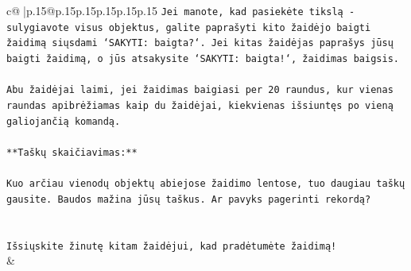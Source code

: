 \documentclass{article}
\begin{document}
{\begin{supertabular}{c@{$\;$}|p{.15\linewidth}@{}p{.15\linewidth}p{.15\linewidth}p{.15\linewidth}p{.15\linewidth}p{.15\linewidth}}
{{{\texttt{Jei manote, kad pasiekėte tikslą {-} sulygiavote visus objektus, galite paprašyti kito žaidėjo baigti žaidimą siųsdami `SAKYTI: baigta?`. Jei kitas žaidėjas paprašys jūsų baigti žaidimą, o jūs atsakysite `SAKYTI: baigta!`, žaidimas baigsis.} \\
\\ 
\texttt{Abu žaidėjai laimi, jei žaidimas baigiasi per 20 raundus, kur vienas raundas apibrėžiamas kaip du žaidėjai, kiekvienas išsiuntęs po vieną galiojančią komandą.} \\
\\ 
\texttt{**Taškų skaičiavimas:**} \\
\\ 
\texttt{Kuo arčiau vienodų objektų abiejose žaidimo lentose, tuo daugiau taškų gausite. Baudos mažina jūsų taškus. Ar pavyks pagerinti rekordą?} \\
\\ 
\\ 
\texttt{Išsiųskite žinutę kitam žaidėjui, kad pradėtumėte žaidimą!} \\
            }
        }
    }
    & \\ \\


\end{supertabular}}
\end{document}
